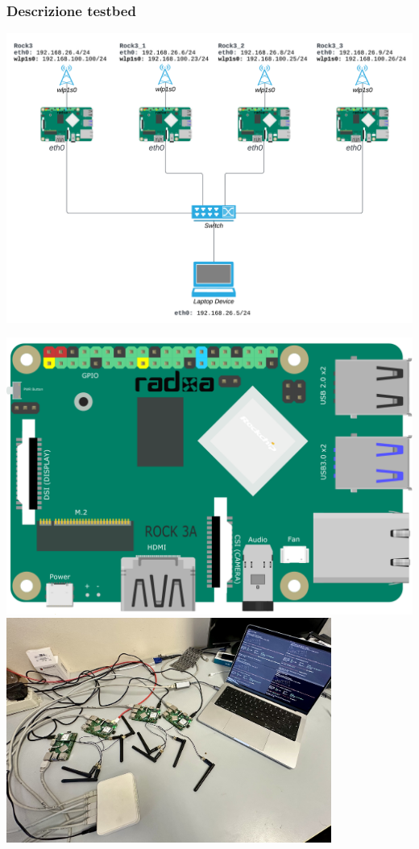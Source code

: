 \documentclass[aspectratio=169]{beamer}
\begin{document}
\begin{frame}
    \frametitle{Descrizione testbed}
    \centering
    \begin{minipage}{0.58\textwidth}
        \includegraphics[width=\textwidth]{topology.png}
    \end{minipage}%
    \hfill
    \begin{minipage}{0.38\textwidth}
        \centering
        \includegraphics[width=\textwidth]{ROCK_3A.png}
        \vspace{0.5cm}
        \includegraphics[width=0.8\textwidth]{topology_photo.jpg}
    \end{minipage}
\end{frame}
\end{document}
